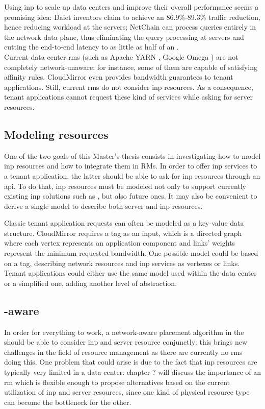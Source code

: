 Using \gls{inp} to scale up data centers and improve their overall performance seems a promising idea: Daiet \cite{daiet} inventors claim to achieve an 86.9\%-89.3\% traffic reduction, hence reducing workload at the servers;
NetChain \cite{netchain} can process queries entirely in the network data plane, thus eliminating the query processing at servers and cutting the end-to-end latency to as little as half of an .\\
Current data center \glspl{rm} (such as Apache YARN \cite{yarn}, Google Omega \cite{omega}) are not completely network-unaware: for instance, some of them are capable of satisfying affinity rules.
CloudMirror \cite{cloudmirror} even provides bandwidth guarantees to tenant applications.
Still, current \glspl{rm} do not consider \gls{inp} resources.
As a consequence, tenant applications cannot request these kind of services while asking for server resources.

\subsection{Modeling \texorpdfstring{}{INP} resources}
One of the two goals of this Master's thesis consists in investigating how to model \gls{inp} resources and how to integrate them in RMs.
In order to offer \gls{inp} services to a tenant application, the latter should be able to ask for \gls{inp} resources through an \gls{api}.
To do that, \gls{inp} resources must be modeled not only to support currently existing \gls{inp} solutions such as \cite{daiet} \cite{netchain} \cite{incbricks} \cite{sharp}, but also future ones. 
It may also be convenient to derive a single model to describe both server and \gls{inp} resources.

Classic tenant application requests can often be modeled as a key-value data structure.
CloudMirror \cite{cloudmirror} requires a \gls{tag} as an input, which is a directed graph where each vertex represents an application component and links' weights represent the minimum requested bandwidth.
One possible model could be based on a \gls{tag}, describing network resources and \gls{inp} services as vertexes or links.
Tenant applications could either use the same model used within the data center or a simplified one, adding another level of abstraction.

\subsection{\texorpdfstring{}{INP}-aware \texorpdfstring{}{Resource Managers}} \label{inp_aware_rms}
In order for everything to work, a network-aware placement algorithm in the  should be able to consider \gls{inp} and server resource conjunctly: this brings new challenges in the field of resource management as there are currently no \glspl{rm} doing this.
One problem that could arise is due to the fact that \gls{inp} resources are typically very limited in a data center: chapter ? will discuss the importance of an \gls{rm} which is flexible enough to propose alternatives based on the current utilization of \gls{inp} and server resources, since one kind of physical resource type can become the bottleneck for the other. %